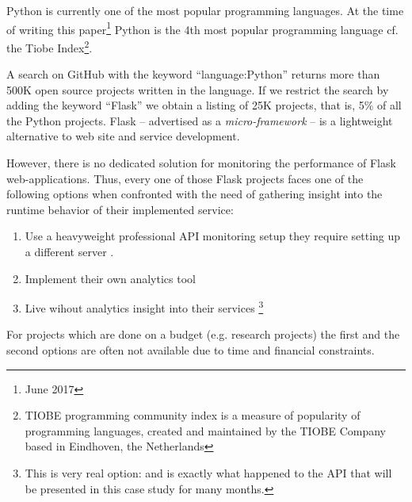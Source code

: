 \documentclass[conference]{IEEEtran}
\begin{document}

Python is currently one of the most popular programming languages. At the time of writing this paper\footnote{June 2017} Python is the 4th most popular programming language cf. the Tiobe Index\footnote{TIOBE programming community index is a measure of popularity of programming languages, created and maintained by the TIOBE Company based in Eindhoven, the Netherlands}. 


A search on GitHub with the keyword ``language:Python'' returns more than 500K open source projects written in the language. If we restrict the search by adding the keyword ``Flask'' we obtain a listing of 25K projects, that is, 5\% of all the Python projects. Flask -- advertised as a {\em micro-framework} -- is a lightweight alternative to web site and service development. 


However, there is no dedicated solution for monitoring the performance of Flask web-applications. Thus, every one of those Flask projects faces one of the following options when confronted with the need of gathering insight into the runtime behavior of their implemented service: 

  \begin{enumerate}

    \item Use a heavyweight professional API monitoring setup they require setting up a different server . 

    \item Implement their own analytics tool 

    \item Live wihout analytics insight into their services \footnote{This is very real option: and is exactly what happened to the API that will be presented in this case study for many months. }

  \end{enumerate}


For projects which are done on a budget (e.g. research projects) the first and the second options are often not available due to time and financial constraints. 
\end{document}
